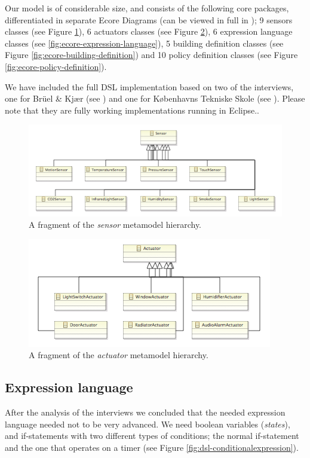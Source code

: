 \documentclass{llncs}
\begin{document}
Our model is of considerable size, and consists of the following core packages, differentiated in separate Ecore Diagrams (can be viewed in full in ); 9 sensors classes (see Figure \ref{fig:ecore-sensors}), 6 actuators classes (see Figure \ref{fig:ecore-actuators}), 6 expression language classes (see \ref{fig:ecore-expression-language}), 5 building definition classes (see Figure \ref{fig:ecore-building-definition}) and 10 policy definition classes (see Figure \ref{fig:ecore-policy-definition}).

We have included the full DSL implementation based on two of the interviews, one for Br\"{u}el \& Kj\ae r (see  ) and one for K\o benhavns Tekniske Skole (see ). Please note that they are fully working implementations running in Eclipse..

\begin{figure}[h]
	\centering
    \includegraphics[scale=0.7]{ecore-sensors.png} 
	\caption{A fragment of the \textit{sensor} metamodel hierarchy.}
	\label{fig:ecore-sensors}
\end{figure}

\begin{figure}[h]
	\centering
    \includegraphics[scale=0.7]{ecore-actuators.png}   
	\caption{A fragment of the \textit{actuator} metamodel hierarchy.}
	\label{fig:ecore-actuators}
\end{figure}

\subsection{Expression language}
After the analysis of the interviews we concluded that the needed expression language needed not to be very advanced. We need boolean variables (\textit{states}), and if-statements with two different types of conditions; the normal if-statement and the one that operates on a timer (see Figure \ref{fig:dsl-conditionalexpression}). 
\end{document}
